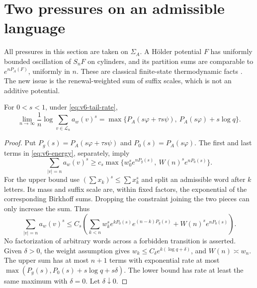 \section{Two pressures on an admissible language}\label{sec:v6-pressure}
All pressures in this section are taken on $\Sigma_A$. A H\"older
potential $F$ has uniformly bounded oscillation of $S_nF$ on cylinders,
and its partition sums are comparable to $e^{nP_A(F)}$, uniformly in
$n$. These are classical finite-state thermodynamic facts
\cite{Bowen2008}. The new issue is the renewal-weighted sum of suffix
scales, which is not an additive potential.

\begin{lemma}\label{lem:v6-partition}
For $0<s<1$, under \eqref{eq:v6-tail-rate},
\begin{equation}
 \lim_{n\to\infty}\frac1n\log\sum_{v\in\mathcal L_n}a_w(v)^s
 =\max\{P_A(s\varphi+\tau s\psi),\ P_A(s\varphi)+s\log q\}.
                                                        \label{eq:v6-mixed-pressure}
\end{equation}
\end{lemma}
\begin{proof}
Put $P_g(s)=P_A(s\varphi+\tau s\psi)$ and $P_0(s)=P_A(s\varphi)$.
The first and last terms in \eqref{eq:v6-energy}, separately, imply
\[
 \sum_{|v|=n}a_w(v)^s\ge
 c_s\max\{w_0^s e^{nP_g(s)},\ W(n)^s e^{nP_0(s)}\}.
\]
For the upper bound use $(\sum x_k)^s\le\sum x_k^s$ and split an
admissible word after $k$ letters. Its mass and suffix scale are,
within fixed factors, the exponential of the corresponding Birkhoff
sums. Dropping the constraint joining the two pieces can only increase
the sum. Thus
\begin{equation}
 \sum_{|v|=n}a_w(v)^s\le C_s\left(
 \sum_{k<n}w_k^s e^{kP_0(s)}e^{(n-k)P_g(s)}
       +W(n)^s e^{nP_0(s)}\right).                       \label{eq:v6-convolution}
\end{equation}
No factorization of arbitrary words across a forbidden transition is
asserted. Given $\delta>0$, the weight assumption gives
$w_k\le C_\delta e^{k(\log q+\delta)}$, and $W(n)\asymp w_n$.
The upper sum has at most $n+1$ terms with exponential rate at most
$\max(P_g(s),P_0(s)+s\log q+s\delta)$. The lower bound has rate at
least the same maximum with $\delta=0$. Let $\delta\downarrow0$.
\end{proof}

